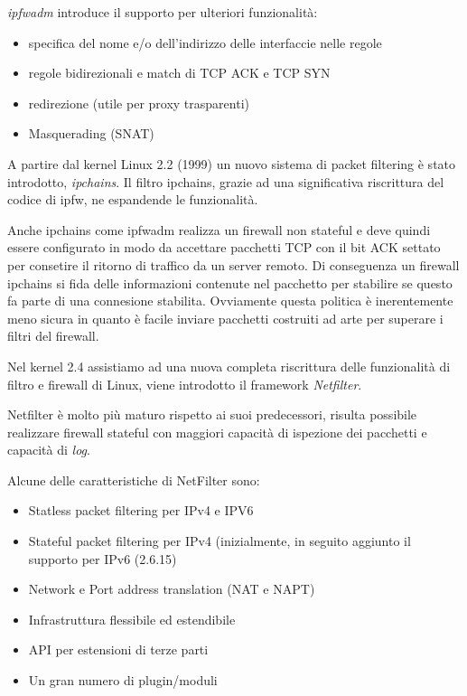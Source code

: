 {\em ipfwadm} introduce il supporto per ulteriori funzionalità:

\begin{itemize}
    \item specifica del nome e/o dell'indirizzo delle interfaccie nelle regole

    \item regole bidirezionali e match di TCP ACK e TCP SYN

    \item redirezione (utile per proxy trasparenti)

    \item Masquerading (SNAT)
\end{itemize}

A partire dal kernel Linux 2.2 (1999) un nuovo sistema di packet filtering è
stato introdotto, {\em ipchains}. Il filtro ipchains, grazie ad una significativa
riscrittura del codice di ipfw, ne espandende le funzionalità.

Anche ipchains come ipfwadm realizza un firewall non stateful e deve
quindi essere configurato in modo da accettare pacchetti TCP con il bit ACK
settato per consetire il ritorno di traffico da un server remoto. Di
conseguenza un firewall ipchains si fida delle informazioni contenute nel
pacchetto per stabilire se questo fa parte di una connesione stabilita.
Ovviamente questa politica è inerentemente meno sicura in quanto è facile
inviare pacchetti costruiti ad arte per superare i filtri del firewall.

Nel kernel 2.4 assistiamo ad una nuova completa riscrittura delle funzionalità
di filtro e firewall di Linux, viene introdotto il framework {\em Netfilter}.

Netfilter è molto più maturo rispetto ai suoi predecessori, risulta possibile
realizzare firewall stateful con maggiori capacità di ispezione dei
pacchetti e capacità di {\em log}.

Alcune delle caratteristiche di NetFilter sono:

\begin{itemize}
    \item Statless packet filtering per IPv4 e IPV6
    \item Stateful packet filtering per IPv4 (inizialmente, in seguito
        aggiunto il supporto per IPv6 (2.6.15)
    \item Network e Port address translation (NAT e NAPT)
    \item Infrastruttura flessibile ed estendibile
    \item API per estensioni di terze parti
    \item Un gran numero di plugin/moduli
\end{itemize}

